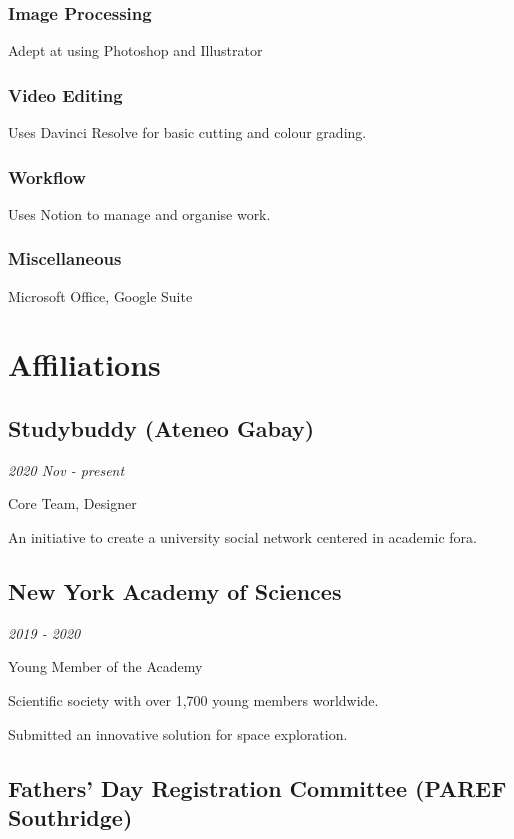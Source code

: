 \documentclass[a4paper, 9pt]{article}
\begin{document}
\subsubsection{Image Processing}
Adept at using Photoshop and Illustrator 

\subsubsection{Video Editing}
Uses Davinci Resolve for basic cutting and colour grading.

\subsubsection{Workflow}
Uses Notion to manage and organise work.

\subsubsection{Miscellaneous}
Microsoft Office, Google Suite


\section{Affiliations}

\subsection{Studybuddy (Ateneo Gabay)}

\hfill {\itshape 2020 Nov - present}

Core Team, Designer

\hspace{1em} An initiative to create a university social network centered in academic fora. 

\subsection{New York Academy of Sciences}

\hfill {\itshape 2019 - 2020}

Young Member of the Academy

\hspace{1em} Scientific society with over 1,700 young members worldwide.

\hspace{1em} Submitted an innovative solution for space exploration.

\subsection{Fathers' Day Registration Committee (PAREF Southridge)}
\end{document}
